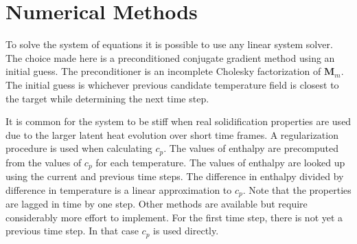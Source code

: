 \documentclass[]{article}
\newcommand{\cp}{c_{p}}
\newcommand{\cnm}{\bm{M}}
\begin{document}
\section{Numerical Methods}

To solve the system of equations it is possible to use any linear system solver. The choice made here is a preconditioned conjugate gradient method using an initial guess. The preconditioner is an incomplete Cholesky factorization of \(\cnm_{m}\). The initial guess is whichever previous candidate temperature field is closest to the target while determining the next time step.

It is common for the system to be stiff when real solidification properties are used due to the larger latent heat evolution over short time frames. A regularization procedure is used when calculating \(\cp\). The values of enthalpy are precomputed from the values of \(\cp\) for each temperature. The values of enthalpy are looked up using the current and previous time steps. The difference in enthalpy divided by difference in temperature is a linear approximation to \(\cp\). Note that the properties are lagged in time by one step. Other methods are available but require considerably more effort to implement. For the first time step, there is not yet a previous time step. In that case \(\cp\) is used directly.
\end{document}
